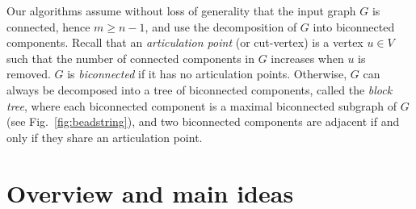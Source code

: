 Our algorithms assume without loss of generality that the input graph
$G$ is connected, hence $m \ge n-1$, and use the decomposition of $G$
into biconnected components. Recall that an \emph{articulation point}
(or cut-vertex) is a vertex $u \in V$ such that the number of
connected components in $G$ increases when $u$ is removed. $G$ is
\emph{biconnected} if it has no articulation points. Otherwise, $G$
can always be decomposed into a tree of biconnected components, called
the \emph{block tree}, where each biconnected component is a maximal
biconnected subgraph of $G$ (see Fig.~\ref{fig:beadstring}), and
two biconnected components are adjacent if and only if they share an
articulation point.

\section{Overview and main ideas}
\label{sec:overview}

